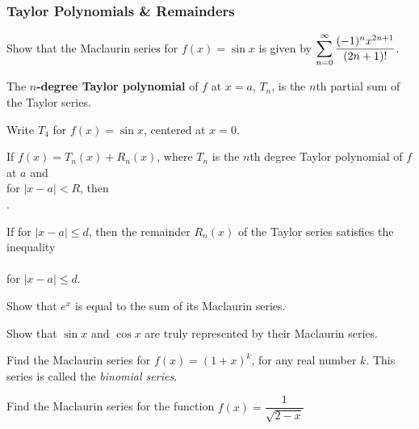 \documentclass[notes]{subfiles}
\begin{document}
	\subsubsection*{Taylor Polynomials \& Remainders}
		\begin{ex}
			Show that the Maclaurin series for $f(x) = \sin x$ is given by $\displaystyle \sum_{n=0}^\infty \dfrac{(-1)^nx^{2n+1}}{(2n+1)!}$.
		\end{ex}
			
		\begin{defn}
			The $n$\textbf{-degree Taylor polynomial} of $f$ at $x = a$, $T_n$, is the $n$th partial sum of the Taylor series.
		\end{defn}
		\begin{ex}
			Write $T_4$ for $f(x) = \sin x$, centered at $x = 0$.
		\end{ex}
			\newpage
			
		\begin{thm}
			If $f(x) = T_n(x) + R_n(x)$, where $T_n$ is the $n$th degree Taylor polynomial of $f$ at $a$ and \\[15pt]  for $|x-a| < R$, then \\[15pt] .
		\end{thm}
		\begin{rmk}
			If  for $|x-a| \leq d$, then the remainder $R_n(x)$ of the Taylor series satisfies the inequality\\[15pt]
				\[\]
				\\[15pt]
			for $|x-a| \leq d$.
		\end{rmk}
		
		\begin{ex}
			Show that $e^x$ is equal to the sum of its Maclaurin series.
		\end{ex}
			
		\begin{ex}
			Show that $\sin x $ and $\cos x$ are truly represented by their Maclaurin series.
		\end{ex}
			\newpage
			
		\begin{ex}
			Find the Maclaurin series for $f(x) = (1+x)^k$, for any real number $k$.  This series is called the \emph{binomial series}.
		\end{ex}
			
		\begin{ex}
			Find the Maclaurin series for the function $f(x) = \dfrac{1}{\sqrt{2-x}}$
		\end{ex}
			\newpage
			
\end{document}
